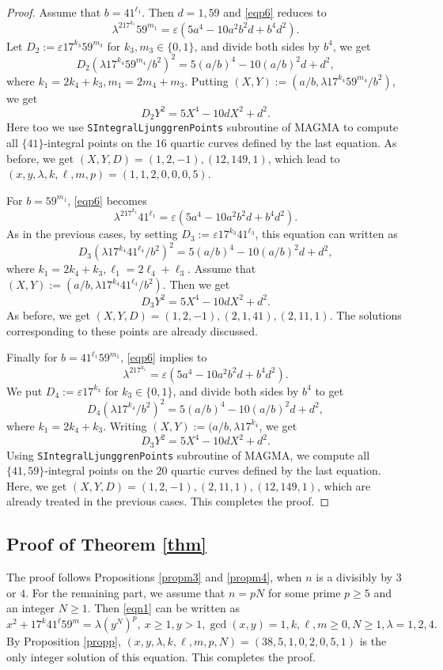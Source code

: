 \documentclass[12pt, 14paper,reqno]{amsart}
\theoremstyle{plain}
\theoremstyle{proof}
\numberwithin{equation}{section}
\begin{document}
\begin{proof}
Assume that $b=41^{\ell_1}$.  Then $d=1, 59$ and \eqref{eqp6} reduces to
$$\lambda^217^{k_1}59^{m_1}=\varepsilon (5a^4-10a^2b^2d+b^4d^2).$$
Let $D_2:=\varepsilon 17^{k_3}59^{m_3}$ for $k_3, m_3\in\{0, 1\}$, and divide both sides by $b^4$, we get
$$D_2(\lambda 17^{k_4}59^{m_4}/b^2)^2=5(a/b)^4-10(a/b)^2d+d^2,$$
where $ k_1=2k_4+k_3, m_1=2m_4+m_3$.
Putting $(X, Y):=(a/b, \lambda 17^{k_4}59^{m_4}/b^2)$, we get
$$D_2Y^2=5X^4-10dX^2+d^2.$$
Here too we use \texttt{SIntegralLjunggrenPoints} subroutine of MAGMA to compute all $\{41\}$-integral points on the $16$ quartic curves defined by the last equation. As before, we get $(X,Y, D)=(1,2,-1), (12,149,1)$, which lead to  $(x,y,\lambda,k,\ell,m,p)=(1,1,2,0,0,0,5)$.

For $b=59^{m_1}$,  \eqref{eqp6} becomes 
$$\lambda^217^{k_1}41^{\ell_1}=\varepsilon (5a^4-10a^2b^2d+b^4d^2).$$
As in the previous cases, by setting $D_3:=\varepsilon 17^{k_3}41^{\ell_3}$, this equation can written as
$$D_3(\lambda 17^{k_4}41^{\ell_4}/b^2)^2=5(a/b)^4-10(a/b)^2d+d^2,$$
where $ k_1=2k_4+k_3, \ell_1=2\ell_4+\ell_3$.
Assume that $(X, Y):=(a/b, \lambda 17^{k_4}41^{\ell_4}/b^2)$. Then we get
$$D_3Y^2=5X^4-10dX^2+d^2.$$
As before, we get $(X,Y, D)=(1,2,-1), (2,1,41), (2,11,1)$. The solutions corresponding to these points are already discussed.

Finally for $b=41^{\ell_1}59^{m_1}$, \eqref{eqp6} implies to
$$\lambda^217^{k_1}=\varepsilon (5a^4-10a^2b^2d+b^4d^2).$$
We put $D_4:=\varepsilon 17^{k_3}$ for $k_3\in\{0, 1\}$, and divide both sides by $b^4$ to get
$$D_4(\lambda 17^{k_4}/b^2)^2=5(a/b)^4-10(a/b)^2d+d^2,$$
where $ k_1=2k_4+k_3$.
Writing $(X, Y):=(a/b, \lambda 17^{k_4}$, we get
$$D_3Y^2=5X^4-10dX^2+d^2.$$
Using \texttt{SIntegralLjunggrenPoints} subroutine of MAGMA, we compute all $\{41,59\}$-integral points on the $20$ quartic curves defined by the last equation. Here, we get $(X,Y, D)=(1,2,-1), (2,11,1), (12, 149,1)$, which are already treated in the previous cases. This completes the proof.
\end{proof}
\subsection{Proof of Theorem \ref{thm}}\label{proofthm}
The proof follows Propositions \ref{propm3} and \ref{propm4}, when $n$ is a divisibly by $3$ or $4$. For the remaining part, we assume that $n=pN$ for some prime $p\geq 5$ and an integer $N\geq 1$. Then \eqref{eqn1} can be written as
$$x^2+17^k41^\ell 59^m=\lambda\left(y^N\right)^p,~ x\geq 1, y>1, \gcd(x, y)=1, k,\ell, m\geq 0, N\geq 1, \lambda=1,2,4.
$$
By Proposition \ref{propp}, $(x,y,\lambda,k,\ell,m,p, N)=(38,5,1,0,2,0,5, 1)$ is the only integer solution of this equation. This completes the proof.  
\end{document}
